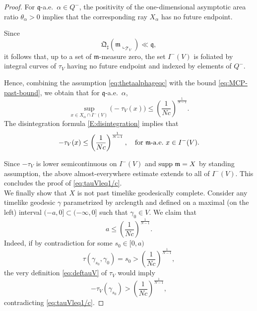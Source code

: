 \documentclass[a4paper,10pt]{article}
\newcommand{\supp}{\text{\rm supp}}
\newcommand{\T}{\mathcal{T}}
\newcommand{\mm}{\mathfrak m}
\newcommand{\qq}{\mathfrak q}
\newcommand{\QQ}{\mathfrak Q}
\theoremstyle{plain}
\theoremstyle{definition}
\numberwithin{equation}{section}
\begin{document}
\begin{proof}
For \( \qq \)-a.e.\ \( \alpha \in Q^- \), the positivity of the one-dimensional asymptotic area ratio \( \theta_\alpha > 0 \) implies that the corresponding ray \( X_\alpha \) has no future endpoint.

Since
\[
\QQ_{\sharp}(\mm\llcorner_{\T_V}) \ll \qq,
\]
it follows that, up to a set of \( \mm \)-measure zero, the set \( I^-(V) \) is foliated by integral curves of \( \tau_V \) having no future endpoint and indexed by elements of \( Q^- \).

Hence, combining the assumption \eqref{eq:thetaalphageqc}  with the bound \eqref{eq:MCP-past-bound}, we obtain that for \( \qq \)-a.e.\ \( \alpha \),
\[
\sup_{x \in X_\alpha \cap I^-(V)} \bigl(-\tau_V(x)\bigr)
\le
\left(\frac{1}{Nc}\right)^{\frac{1}{N-1}} .
\]
The disintegration formula \eqref{E:disintegration} implies that
\[
-\tau_V(x) \le \left(\frac{1}{Nc}\right)^{\frac{1}{N-1}}  , \quad \text{for \( \mm \)-a.e.\ \( x \in I^-(V) \)}.
\]

Since \( -\tau_V \) is lower semicontinuous on \( I^-(V) \) and \( \supp\ \mm = X \) by standing assumption, the above almost-everywhere estimate extends to all of \( I^-(V) \). This concludes the proof of \eqref{eq:tauVleq1/c}.
\\


We finally show that $X$ is not past timelike geodesically complete. 
Consider any timelike geodesic $\gamma$ parametrized by arclength and defined on a maximal (on the left) interval $(-a, 0]\subset (-\infty, 0]$  such that  
$\gamma_{0} \in V$. We claim that 
$$
a\leq  \left(\frac{1}{Nc}\right)^{\frac{1}{N-1}}.
$$
Indeed, if by contradiction for some $s_{0}\in [0,a)$
$$
\tau(\gamma_{s_0}, \gamma_{0}) =s_{0} >  \left(\frac{1}{Nc}\right)^{\frac{1}{N-1}},
$$
the very  definition \eqref{eq:deftauV} of $\tau_{V}$ would imply $$-\tau_{V} (\gamma_{s_{0}})>  \left(\frac{1}{Nc}\right)^{\frac{1}{N-1}},$$ contradicting \eqref{eq:tauVleq1/c}.
\end{proof}
\end{document}
